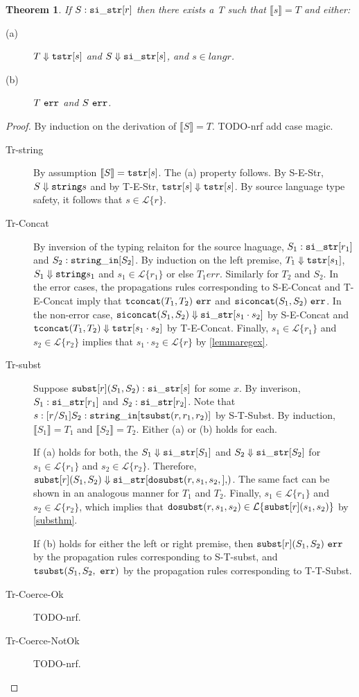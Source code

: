 \documentclass[10pt,preprint]{sigplanconf}
\newtheorem{thm}{Theorem}
\theoremstyle{definition}
\newcommand{\Lagr}{\mathcal{L}}
\newcommand{\lang}[1]{\Lagr\{#1\}}
\newcommand{\sisubst}[3]{{\tt subst}[#1](#2,#3)}
\newcommand{\sistr}[1]{{\tt si\_str}[#1]}
\newcommand{\strin}[1]{\sistr{#1}}
\newcommand{\siconcat}[2]{{\tt siconcat}(#1,#2)}
\newcommand{\stringin}[1]{{\tt string\_in}[#1]}
\newcommand{\tsubst}[3]{{\tt tsubst}(#1,#2,#3)}
\renewcommand{\tstr}[1]{{{\tt tstr}[#1]}}
\newcommand{\tconcat}[2]{{\tt tconcat}(#1,#2)}
\newcommand{\str}{{\tt string}}
\newcommand{\dosubst}[3]{{\tt dosubst}(#1,#2,#3)}
\newcommand{\err}{\ {\tt err}}
\newcommand{\trden}[1]{\llbracket #1 \rrbracket} %
\newcommand{\treduces}{ \Downarrow }
\newcommand{\sreduces}{ \Downarrow }
\begin{document}
\begin{thm}
If $S : \strin{r}$ then there exists a T such that $\trden{s} = T$ and either: 
\begin{description}
  \item[(a)] $T \treduces \tstr{s}$ and $S \sreduces \strin{s}$, and $s \in lang{r}$.
  \item[(b)] $T \err$ and $S \err$.
  \end{description}
\end{thm}
\begin{proof}
By induction on the derivation of $\trden{S} = T$. TODO-nrf add case magic.
\begin{description}
\item[Tr-string] By assumption $\trden{S} = \tstr{s}$. The (a) property follows.
By S-E-Str, $S \sreduces \str{s}$ and by T-E-Str, $\tstr{s} \treduces \tstr{s}$.
By source language type safety, it follows that $s \in \lang{r}$.
\item[Tr-Concat]
By inversion of the typing relaiton for the source lnaguage, $S_1 : \strin{r_1}$ and $S_2 : \stringin{S_2}$.
By induction on the left premise, $T_1 \treduces \tstr{s_1}$, $S_1 \sreduces \str{s_1}$ and $s_1 \in \lang{r_1}$
or else $T_1 err$. 
Similarly for $T_2$ and $S_2$.
In the error cases, the propagations rules corresponding to S-E-Concat and T-E-Concat imply that $\tconcat{T_1}{T_2} \err$ and $\siconcat{S_1}{S_2} \err$.
In the non-error case, $\siconcat{S_1}{S_2} \sreduces \strin{s_1 \cdot s_2}$ by S-E-Concat and $\tconcat{T_1}{T_2} \treduces \tstr{s_1 \cdot s_2}$ by T-E-Concat.
Finally, $s_1 \in \lang{r_1}$ and $s_2 \in \lang{r_2}$ implies that $s_1 \cdot s_2 \in \lang{r}$ by \ref{lemmaregex}.
\item[Tr-subst]
Suppose $\sisubst{r}{S_1}{S_2} : \strin{s}$ for some $x$. 
By inverison, $S_1 : \strin{r_1}$ and $S_2 : \strin{r_2}$.
Note that $s : \subst{r}{S_1}{S_2} : \stringin{\tsubst{r}{r_1}{r_2}}$ by S-T-Subst.
By induction, $\trden{S_1} = T_1$ and $\trden{S_2} = T_2$.
Either (a) or (b) holds for each.

If (a) holds for both, the $S_1 \sreduces \strin{S_1}$ and $S_2 \sreduces \strin{S_2}$ for $s_1 \in \lang{r_1}$ and $s_2 \in \lang{r_2}$.
Therefore, $\sisubst{r}{S_1}{S_2} \sreduces \strin{\dosubst{r,s_1,s_2}}$.
The same fact can be shown in an analogous manner for $T_1$ and $T_2$.
Finally, $s_1 \in \lang{r_1}$ and $s_2 \in \lang{r_2}$, which implies that $\dosubst{r}{s_1}{s_2} \in \lang{\sisubst{r}{s_1}{s_2}}$ by \ref{substhm}.

If (b) holds for either the left or right premise, then $\sisubst{r}{S_1}{S_2} \err$ by the propagation rules corresponding to S-T-subst, 
and $\tsubst{S_1}{S_2} \err$ by the propagation rules corresponding to T-T-Subst.

\item[Tr-Coerce-Ok] TODO-nrf.

\item[Tr-Coerce-NotOk] TODO-nrf.

\end{description}
\end{proof}
\end{document}
